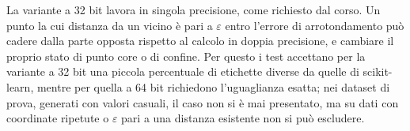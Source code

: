 La variante a 32 bit lavora in singola precisione, come richiesto dal corso. Un punto la cui distanza da un vicino è pari a $\varepsilon$ entro l'errore di arrotondamento può cadere dalla parte opposta rispetto al calcolo in doppia precisione, e cambiare il proprio stato di punto core o di confine. Per questo i test accettano per la variante a 32 bit una piccola percentuale di etichette diverse da quelle di scikit-learn, mentre per quella a 64 bit richiedono l'uguaglianza esatta; nei dataset di prova, generati con valori casuali, il caso non si è mai presentato, ma su dati con coordinate ripetute o $\varepsilon$ pari a una distanza esistente non si può escludere.
